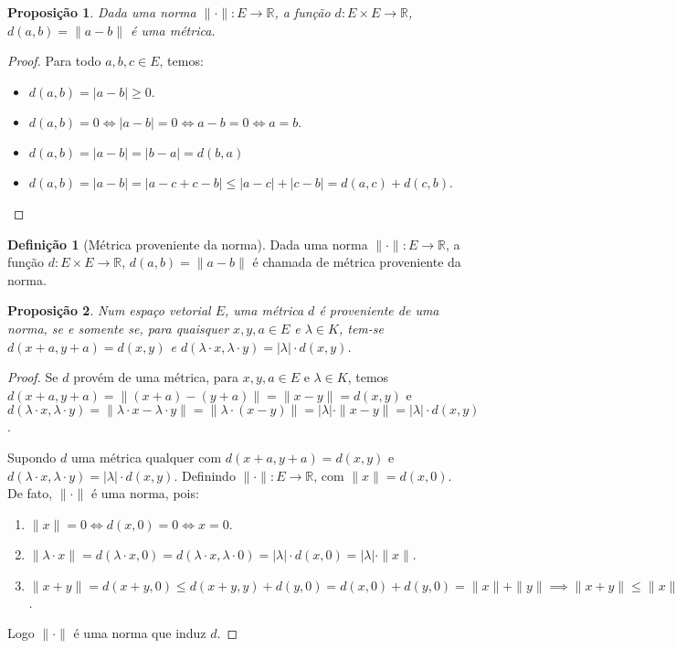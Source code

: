 \documentclass{article}
\theoremstyle{plain}
\newtheorem{prop}{Proposição}[section]
\theoremstyle{definition}
\newtheorem{definicao}{Definição}[section]
\theoremstyle{remark}
\begin{document}
\begin{prop}
	Dada uma norma $\| \cdot \|: E \to \mathbb{R}$, a função $d: E\times E \to \mathbb{R}$, $d(a,b) = \| a-b\|$ é uma métrica.
\end{prop}
\begin{proof}
	Para todo $a,b,c\in E$, temos:
	\begin{itemize}
		\item $d(a,b) = |a-b| \geq 0 $.
		\item $d(a,b) = 0 \iff |a-b| = 0 \iff a-b = 0 \iff a = b.$
		\item $d(a,b) = |a-b| = |b-a| = d(b,a)$
		\item $d(a,b) =  |a-b|  = |a-c+c-b| \leq |a-c| + |c-b| = d(a,c) + d(c,b)$.
	\end{itemize}
\end{proof}
\begin{definicao}[Métrica proveniente da norma]
	Dada uma norma $\| \cdot \|: E \to \mathbb{R}$, a função $d: E\times E \to \mathbb{R}$, $d(a,b) = \| a-b\|$ é chamada de métrica proveniente da norma.
\end{definicao}
\begin{prop}
	Num espaço vetorial $E$, uma métrica $d$ é proveniente de uma norma, se e somente se,  para quaisquer $x,y,a\in E$ e $\lambda\in K$, tem-se $d(x+a, y+a) = d(x,y)$ e $d(\lambda \cdot x, \lambda \cdot y ) = |\lambda| \cdot d(x,y)$.
\end{prop}
\begin{proof}
	Se $d$ provém de uma métrica, para $x,y, a\in E$ e $\lambda \in K$, temos  $d(x+a,y+a) = \|(x+a) -(y+a) \| = \| x- y\| = d(x,y)$ e $d(\lambda \cdot x, \lambda \cdot y ) = \| \lambda\cdot x  - \lambda \cdot y \| = \| \lambda\cdot (x-y) \| = |\lambda|\cdot \| x-y\| = |\lambda | \cdot d(x,y)$.

	Supondo $d$ uma métrica qualquer com $d(x+a, y+a) = d(x,y)$ e $d(\lambda \cdot x, \lambda \cdot y ) = |\lambda| \cdot d(x,y)$. Definindo $\| \cdot \| : E \to \mathbb{R}$, com $\|x\| = d(x,0)$. De fato, $\| \cdot \| $ é uma norma, pois:
	\begin{enumerate}
		\item $\| x\| = 0 \iff d(x,0) = 0 \iff x =0$.
		\item $\| \lambda \cdot x \| = d(\lambda \cdot x, 0) = d(\lambda \cdot x, \lambda \cdot 0) = |\lambda |\cdot d(x,0) = |\lambda|\cdot \| x\|$.
		\item $\| x+y\| = d(x+y,0) \leq d(x+y, y) + d(y , 0) = d(x,0) + d(y,0) = \| x\| + \|y\| \implies \| x+y \| \leq \|x\| +   \|y\|$.
	\end{enumerate}
	Logo $\|\cdot \|$ é uma norma que induz $d$.
\end{proof}
\end{document}
